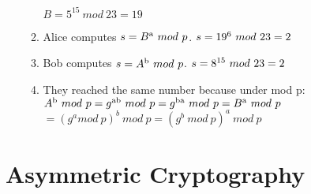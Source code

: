 \documentclass{article}
\begin{document}
\begin{itemize}
\begin{enumerate}
        \subitem $B = 5^{15}\ mod\ 23 = 19 $
      \item Alice computes $ s = B\textsuperscript{a}\ mod\ p$.
        \subitem $s = 19\textsuperscript{6}\ mod\ 23 = 2$
      \item Bob computes $ s = A\textsuperscript{b}\ mod\ p$.
        \subitem $s = 8\textsuperscript{15}\ mod\ 23 = 2$
      \item They reached the same number because under mod p:
        \subitem $A\textsuperscript{b}\ mod\ p = g\textsuperscript{ab}\ mod\ p = g\textsuperscript{ba}\ mod\ p = B\textsuperscript{a}\ mod\ p$
        \subitem $= (g^{a}mod\ p)^{b}\ mod\ p = (g^{b}\ mod\ p)^{a}\ mod\ p$
    \end{enumerate}
\end{itemize}

\section*{Asymmetric Cryptography}
\end{document}

